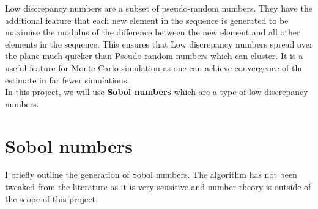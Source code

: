 \documentclass{report}
\theoremstyle{plain}
\theoremstyle{definition}
\begin{document}
Low discrepancy numbers are a subset of pseudo-random numbers. They have the additional feature that each new element in the sequence is generated to be maximise the modulus of the difference between the new element and all other elements in the sequence. This ensures that Low discrepancy numbers spread over the plane much quicker than Pseudo-random numbers which can cluster. It is a useful feature for Monte Carlo simulation as one can achieve convergence of the estimate in far fewer simulations.\\


In this project, we will use \textbf{Sobol numbers} which are a type of low discrepancy numbers.

\section{Sobol numbers}

I briefly outline the generation of Sobol numbers. The algorithm has not been tweaked from the literature as it is very sensitive and number theory is outside of the scope of this project.\\
\end{document}
